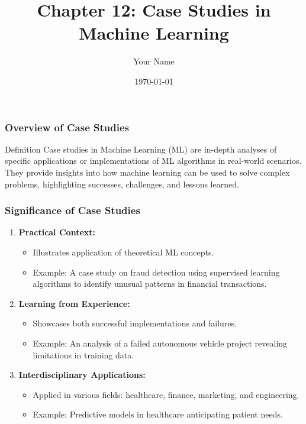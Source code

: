 \documentclass{beamer}
\title{Chapter 12: Case Studies in Machine Learning}
\author{Your Name}
\institute{Your Institution}
\date{\today}
\begin{document}
\frame{\titlepage}

\begin{frame}[fragile]
    \titlepage
\end{frame}

\begin{frame}[fragile]
    \frametitle{Overview of Case Studies}
    \begin{block}{Definition}
        Case studies in Machine Learning (ML) are in-depth analyses of specific applications or implementations of ML algorithms in real-world scenarios. They provide insights into how machine learning can be used to solve complex problems, highlighting successes, challenges, and lessons learned.
    \end{block}
\end{frame}

\begin{frame}[fragile]
    \frametitle{Significance of Case Studies}
    \begin{enumerate}
        \item \textbf{Practical Context:}
        \begin{itemize}
            \item Illustrates application of theoretical ML concepts.
            \item Example: A case study on fraud detection using supervised learning algorithms to identify unusual patterns in financial transactions.
        \end{itemize}

        \item \textbf{Learning from Experience:}
        \begin{itemize}
            \item Showcases both successful implementations and failures.
            \item Example: An analysis of a failed autonomous vehicle project revealing limitations in training data.
        \end{itemize}

        \item \textbf{Interdisciplinary Applications:}
        \begin{itemize}
            \item Applied in various fields: healthcare, finance, marketing, and engineering.
            \item Example: Predictive models in healthcare anticipating patient needs.
        \end{itemize}
    \end{enumerate}
\end{frame}
\end{document}

